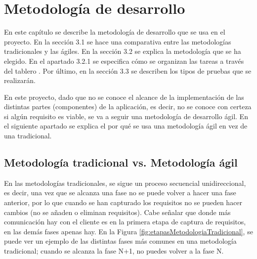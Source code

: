 %
%
\setlength{\parskip}{\baselineskip}

\chapter{Metodolog\'ia de desarrollo}


\begin{resumen}
	
	En este cap\'itulo se describe la metodolog\'ia de desarrollo que se usa en el proyecto. En la secci\'on 3.1 se hace una comparativa entre las metodolog\'ias tradicionales y las \'agiles. En la secci\'on 3.2 se explica la metodolog\'ia que se ha elegido. En el apartado 3.2.1 se especifica c\'omo se organizan las tareas a trav\'es del tablero \kanban. Por \'ultimo, en la secci\'on 3.3 se describen los tipos de pruebas que se realizar\'an. 
	
\end{resumen}

	En este proyecto, dado que no se conoce el alcance de la implementaci\'on de las distintas partes (componentes) de la aplicaci\'on, es decir, no se conoce con certeza si alg\'un requisito es viable, se va a seguir una metodolog\'ia de desarrollo \'agil. En el siguiente apartado se explica el por qu\'e se usa una metodolog\'ia \'agil en vez de una tradicional.


\section{Metodolog\'ia tradicional vs. Metodolog\'ia \'agil}
\label{cap3:sec:metodologia_tradicional_vs_metodologia_agil}

	En las metodolog\'ias tradicionales, se sigue un proceso secuencial unidireccional, es decir, una vez que se alcanza una fase no se puede volver a hacer una fase anterior, por lo que cuando se han capturado los requisitos no se pueden hacer cambios (no se a\~{n}aden o eliminan requisitos). Cabe se\~{n}alar que donde m\'as comunicaci\'on hay con el cliente es en la primera etapa de captura de requisitos, en las dem\'as fases apenas hay. En la Figura \ref{fig:etapasMetodologiaTradicional}, se puede ver un ejemplo de las distintas fases m\'as comunes en una metodolog\'ia tradicional; cuando se alcanza la fase N+1, no puedes volver a la fase N.
	
